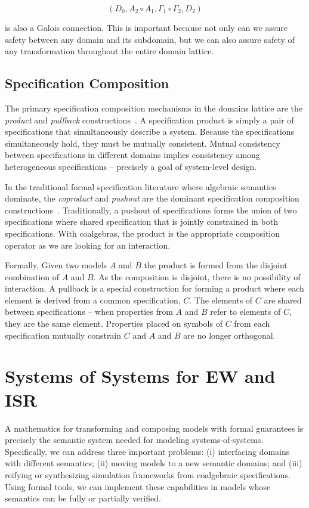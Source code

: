 \documentclass[12pt]{article}
\begin{document}
\[(D_0, A_2 \circ A_1, \Gamma_1 \circ \Gamma_2, D_2)\]

\noindent is also a Galois connection.  This is important because not
only can we assure safety between any domain and its subdomain, but we
can also assure safety of any transformation throughout the entire
domain lattice.

\subsection{Specification Composition}

The primary specification composition mechanisms in the domains
lattice are the \emph{product} and \emph{pullback}
constructions~\cite{Ehrig:85:Fundamentals-of}.  A specification
product is simply a pair of specifications that simultaneously
describe a system.  Because the specifications simultaneously hold,
they must be mutually consistent.  Mutual consistency between
specifications in different domains implies consistency among
heterogeneous specifications -- precisely a goal of system-level
design.

In the traditional formal specification literature where algebraic
semantics dominate, the \emph{coproduct} and \emph{pushout} are the
dominant specification composition
constructions~\cite{Ehrig:85:Fundamentals-of,Smith:93:Constructing-Sp,Smith:90:KIDS:-A-Semiaut}.
Traditionally, a pushout of specifications forms the union of two
specifications where shared specification that is jointly constrained
in both specifications.  With coalgebras, the product is the
appropriate composition operator as we are looking for an interaction.

Formally, Given two models $A$ and $B$ the product is formed from the
disjoint combination of $A$ and $B$. As the composition is disjoint,
there is no possibility of interaction.  A pullback is a special
construction for forming a product where each element is derived from
a common specification, $C$.  The elements of $C$ are shared between
specifications -- when properties from $A$ and $B$ refer to elements
of $C$, they are the same element.  Properties placed on symbols of
$C$ from each specification mutually constrain $C$ and $A$ and $B$ are
no longer orthogonal.

\section{Systems of Systems for EW and ISR}

A mathematics for transforming and composing models with formal
guarantees is precisely the semantic system needed for modeling
systems-of-systems.  Specifically, we can address three important
problems: (i) interfacing domains with different semantics; (ii)
moving models to a new semantic domains; and (iii) reifying or
synthesizing simulation frameworks from coalgebraic specifications.
Using formal tools, we can implement these capabilities in models
whose semantics can be fully or partially verified.
\end{document}
